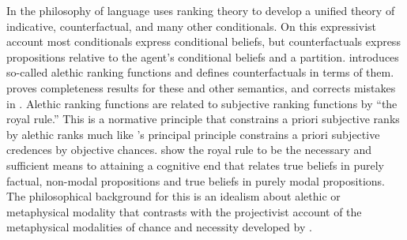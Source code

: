 In the philosophy of language \citet{s13, s15} uses ranking theory to develop a unified theory of indicative, counterfactual, and many other conditionals. On this expressivist account most conditionals express conditional beliefs, but counterfactuals express propositions relative to the agent's conditional beliefs and a partition. %
\citet{h14b, h17} introduces so-called alethic ranking functions and defines counterfactuals in terms of them. \citet{r19} proves completeness results for these and other semantics, and corrects mistakes in \citet{h14b,h15b,h17}. Alethic ranking functions are related to subjective ranking functions by ``the royal rule.'' This is a normative principle that constrains a priori subjective ranks by alethic ranks much like \citet{l80}'s principal principle constrains a priori subjective credences by objective chances. \citet{h17} show the royal rule to be the necessary and sufficient means to attaining a cognitive end that relates true beliefs in purely factual, non-modal propositions and true beliefs in purely modal propositions. The philosophical background for this is an idealism about alethic or metaphysical modality that contrasts with the projectivist account of the metaphysical modalities of chance and necessity developed by \citet{s10}.


